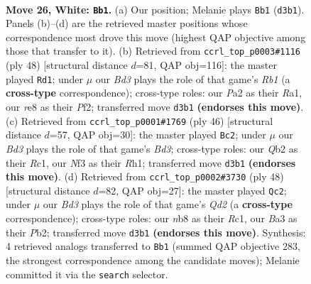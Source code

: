 \documentclass[11pt]{article}
\begin{document}
\clearpage

\begin{figure}[p]\centering
\begin{subfigure}{0.46\textwidth}\centering
\resizebox{\linewidth}{!}{%
\newchessgame
\chessboard[
  setfen={rnbqr1k1/5p2/1p2pnp1/7p/p1PP4/B2B1NPP/PQ2RP2/R5K1 w - - 7 26},
  showmover=false,
  pgfstyle=straightmove, color=movearrow, markmove={d3-b1}
]}
\caption{}
\end{subfigure}\hfill
\begin{subfigure}{0.46\textwidth}\centering
\resizebox{\linewidth}{!}{%
\newchessgame
\chessboard[
  setfen={2rrb1k1/p1q2pp1/Pp2pn1p/8/2PP4/3BQN1P/5PP1/RR4K1 w - - 1 25},
  showmover=false,
  pgfstyle=straightmove, color=movearrow, markmove={b1-d1}
]}
\caption{}
\end{subfigure}
\\[4pt]
\begin{subfigure}{0.46\textwidth}\centering
\resizebox{\linewidth}{!}{%
\newchessgame
\chessboard[
  setfen={2r3k1/p2rqpb1/4pnp1/BPp4p/P1Q2P1P/3BP3/4KP2/2R4R w - - 1 24},
  showmover=false,
  pgfstyle=straightmove, color=movearrow, markmove={d3-c2}
]}
\caption{}
\end{subfigure}\hfill
\begin{subfigure}{0.46\textwidth}\centering
\resizebox{\linewidth}{!}{%
\newchessgame
\chessboard[
  setfen={2rqnrk1/3p4/1pbPpp2/6pp/p1PN4/5PB1/PP1Q2PP/2R1R1K1 w - - 0 25},
  showmover=false,
  pgfstyle=straightmove, color=movearrow, markmove={d2-c2}
]}
\caption{}
\end{subfigure}
\caption{\textbf{Move 26, White: \texttt{Bb1}.} (a) Our position; Melanie plays \texttt{Bb1} (\texttt{d3b1}). Panels (b)--(d) are the retrieved master positions whose correspondence most drove this move (highest QAP objective among those that transfer to it). (b) Retrieved from \texttt{ccrl\_top\_p0003\#1116} (ply 48) [structural distance $d$=81, QAP obj=116]: the master played \texttt{Rd1}; under $\mu$ our \emph{Bd3} plays the role of that game's \emph{Rb1} (a \textbf{cross-type} correspondence); cross-type roles: our \emph{P}a2 as their \emph{R}a1, our \emph{r}e8 as their \emph{P}f2; transferred move \texttt{d3b1} \textbf{(endorses this move)}. (c) Retrieved from \texttt{ccrl\_top\_p0001\#1769} (ply 46) [structural distance $d$=57, QAP obj=30]: the master played \texttt{Bc2}; under $\mu$ our \emph{Bd3} plays the role of that game's \emph{Bd3}; cross-type roles: our \emph{Q}b2 as their \emph{R}c1, our \emph{N}f3 as their \emph{R}h1; transferred move \texttt{d3b1} \textbf{(endorses this move)}. (d) Retrieved from \texttt{ccrl\_top\_p0002\#3730} (ply 48) [structural distance $d$=82, QAP obj=27]: the master played \texttt{Qc2}; under $\mu$ our \emph{Bd3} plays the role of that game's \emph{Qd2} (a \textbf{cross-type} correspondence); cross-type roles: our \emph{n}b8 as their \emph{R}c1, our \emph{B}a3 as their \emph{P}b2; transferred move \texttt{d3b1} \textbf{(endorses this move)}. Synthesis: 4 retrieved analogs transferred to \texttt{Bb1} (summed QAP objective 283, the strongest correspondence among the candidate moves); Melanie committed it via the \texttt{search} selector.}
\label{fig:thought-m50}
\end{figure}
\end{document}
